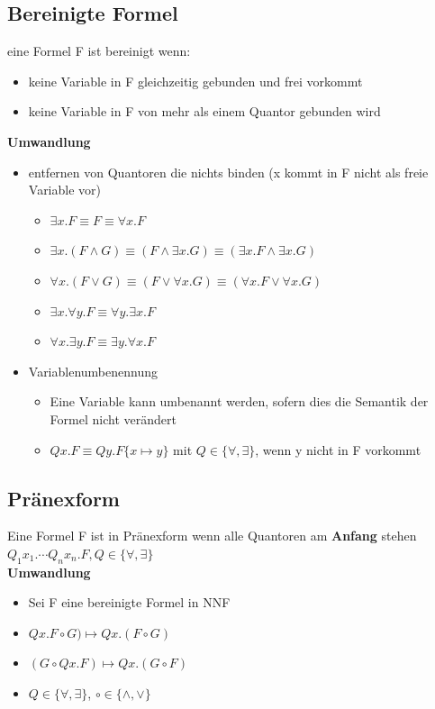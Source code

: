 \documentclass[12pt,a4paper]{article}
\begin{document}
\subsection{Bereinigte Formel}
eine Formel F ist bereinigt wenn:
\begin{itemize}
\item keine Variable in F gleichzeitig gebunden und frei vorkommt
\item keine Variable in F von mehr als einem Quantor gebunden wird
\end{itemize}
\textbf{Umwandlung}
\begin{itemize}
\item entfernen von Quantoren die nichts binden (x kommt in F nicht als freie Variable vor)
\begin{itemize}
\item $\exists x.F \equiv F \equiv \forall x.F$
\item $\exists x. (F\land G) \equiv (F \land \exists x.G) \equiv (\exists x.F \land \exists x.G)$
\item $\forall x. (F \lor G) \equiv (F \lor \forall x.G) \equiv (\forall x.F \lor \forall x.G)$
\item $\exists x. \forall y.F \equiv \forall y .\exists x .F$
\item $\forall x . \exists y .F \equiv \exists y .\forall x .F$
\end{itemize}
\item Variablenumbenennung
\begin{itemize}
\item Eine Variable kann umbenannt werden, sofern dies die Semantik der Formel nicht verändert
\item $Qx.F \equiv Qy.F\{x\mapsto y\}$ mit $Q \in \{ \forall, \exists \}$, wenn y nicht in F vorkommt
\end{itemize}
\end{itemize}

\subsection{Pränexform}
Eine Formel F ist in Pränexform wenn alle Quantoren am \textbf{Anfang} stehen\\
$Q_1x_1.\cdots Q_nx_n.F, Q\in\{ \forall ,\exists \}$\\
\textbf{Umwandlung}\\
\begin{itemize}
\item Sei F eine bereinigte Formel in NNF
\item $Qx.F \circ G) \mapsto Qx.(F\circ G)$
\item $(G \circ Qx.F) \mapsto Qx.(G\circ F)$
\item $Q \in \{ \forall, \exists \}$, $\circ \in \{ \land ,\lor \}$
\end{itemize}
\end{document}
